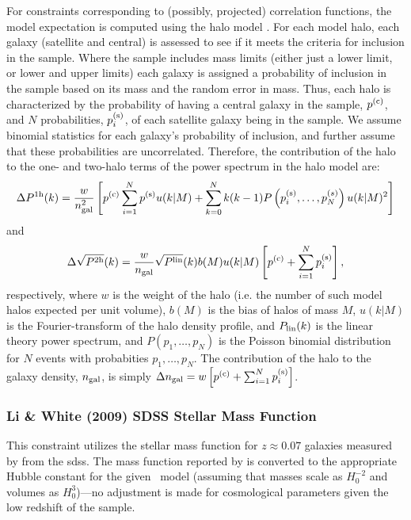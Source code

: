 For constraints corresponding to (possibly, projected) correlation functions, the model expectation is computed using the halo model \cite{cooray_halo_2002}. For each model halo, each galaxy (satellite and central) is assessed to see if it meets the criteria for inclusion in the sample. Where the sample includes mass limits (either just a lower limit, or lower and upper limits) each galaxy is assigned a probability of inclusion in the sample based on its mass and the random error in mass. Thus, each halo is characterized by the probability of having a central galaxy in the sample, $p^{\rm (c)}$, and $N$ probabilities, $p_i^{\rm (s)}$, of each satellite galaxy being in the sample. We assume binomial statistics for each galaxy's probability of inclusion, and further assume that these probabilities are uncorrelated. Therefore, the contribution of the halo to the one- and two-halo terms of the power spectrum in the halo model are:
\begin{equation}
\Delta P^{\rm 1h}(k) = {w \over n_{\rm gal}^2} \left[ p^{\rm (c)} \sum_{i=1}^N p^{\rm (s)} u(k|M) + \sum_{k=0}^N k(k-1) P\left(p_i^{\rm (s)},\ldots,p_N^{(s)}\right) u(k|M)^2 \right]
\end{equation}
and
\begin{equation}
\Delta \sqrt{P^{\rm 2h}}(k) = {w \over n_{\rm gal}} \sqrt{P^{\rm lin}}(k) b(M) u(k|M) \left[ p^{\rm (c)} + \sum_{i=1}^N p_i^{\rm (s)} \right],
\end{equation}
respectively, where $w$ is the weight of the halo (i.e. the number of such model halos expected per unit volume), $b(M)$ is the bias of halos of mass $M$, $u(k|M)$ is the Fourier-transform of the halo density profile, and $P_{\rm lin}(k)$ is the linear theory power spectrum, and $P(p_1,\ldots,p_N)$ is the Poisson binomial distribution for $N$ events with probabities $p_1,\ldots,p_N$. The contribution of the halo to the galaxy density, $n_{\rm gal}$, is simply $\Delta n_{\rm gal} = w \left[ p^{\rm (c)} + \sum_{i=1}^N p_i^{\rm (s)} \right]$.

\subsubsection{Li \& White (2009) SDSS Stellar Mass Function}

This constraint utilizes the stellar mass function for $z\approx 0.07$ galaxies measured by \cite{li_distribution_2009} from the \gls{sdss}. The mass function reported by \cite{li_distribution_2009} is converted to the appropriate Hubble constant for the given \glc\ model (assuming that masses scale as $H_0^{-2}$ and volumes as $H_0^3$)---no adjustment is made for cosmological parameters given the low redshift of the sample.

